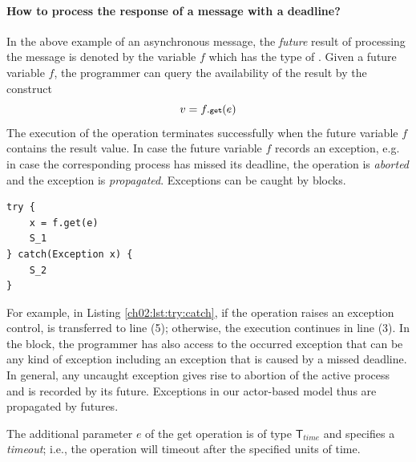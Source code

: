 \paragraph*{How to process the response of a message with a deadline?}
In the above example of an asynchronous message, the \emph{future} result of processing the  message   
is denoted by the  variable $f$ which has the type of \textbf{}.
Given a future variable $f$, the programmer can query  the  availability of the  result by the construct
$$
v = f.{\textnormal{\textbf{{\scriptsize\texttt{get}}}}}(e)
$$
The execution of the \gett \space operation terminates successfully when  the future variable $f$ contains the result value.
In case the future variable $f$ records an exception, e.g. in case the corresponding process has missed its  deadline,
the \gett\space operation is \emph{aborted} and the exception is \emph{propagated}. 
Exceptions can be caught by  blocks. 

\begin{lstlisting}[float=h, label=lst:try:catch, caption=Using try-catch for processing future values]
try {
	x = f.get(e)
	S_1
} catch(Exception x) {
	S_2
}
\end{lstlisting}

For example, in Listing \ref{ch02:lst:try:catch}, if the \gett \space operation raises an exception  control,  is transferred to line (5);
otherwise, the execution continues in line (3). 
In the  block, the programmer has also access to the occurred exception that can be 
any kind of exception including an exception that is caused by a missed deadline.
In general, any uncaught exception gives rise to abortion of the active process and is recorded by its future.
Exceptions in our actor-based model thus are propagated by futures.

The additional parameter $e$ of the get operation is of type  $\mathsf{T}_{time}$ and specifies a \emph{timeout};
i.e., the \gett \space operation will timeout after the specified units of time.





